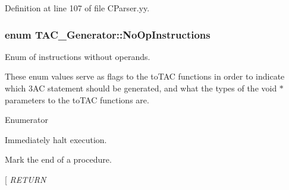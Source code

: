 Definition at line 107 of file C\-Parser.\-yy.

\hypertarget{classTAC__Generator_a3942f3e280fb83e44ad85eb13d56dfb5}{
\subsubsection[{No\-Op\-Instructions}]{\setlength{\rightskip}{0pt plus 5cm}enum {\bf T\-A\-C\-\_\-\-Generator\-::\-No\-Op\-Instructions}}}\label{classTAC__Generator_a3942f3e280fb83e44ad85eb13d56dfb5}


Enum of instructions without operands. 

These enum values serve as flags to the to\-T\-A\-C functions in order to indicate which 3\-A\-C statement should be generated, and what the types of the void $\ast$ parameters to the to\-T\-A\-C functions are. \begin{Desc}
\item[Enumerator]\par
\begin{description}
\item[{\em 
\hypertarget{classTAC__Generator_a3942f3e280fb83e44ad85eb13d56dfb5a8e16b137fe321cada85cb3ab596934f7}{H\-A\-L\-T}\label{classTAC__Generator_a3942f3e280fb83e44ad85eb13d56dfb5a8e16b137fe321cada85cb3ab596934f7}
}]Immediately halt execution. \item[{\em 
\hypertarget{classTAC__Generator_a3942f3e280fb83e44ad85eb13d56dfb5ab8cc9678456e68db56838ba762eb03cf}{E\-N\-D\-P\-R\-O\-C}\label{classTAC__Generator_a3942f3e280fb83e44ad85eb13d56dfb5ab8cc9678456e68db56838ba762eb03cf}
}]Mark the end of a procedure. \item[{\em 
\hypertarget{classTAC__Generator_a3942f3e280fb83e44ad85eb13d56dfb5a0e868fa94bac0750a62dfa98d0f56510}{R\-E\-T\-U\-R\-N}\label{classTAC__Generator_a3942f3e280fb83e44ad85eb13d56dfb5a0e868fa94bac0750a62dfa98d0f56510}
}
\end{description}
\end{Desc}
